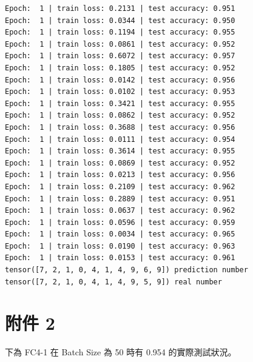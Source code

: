 \documentclass[11pt,UTF8]{ctexart}
\begin{document}
\begin{verbatim}
Epoch:  1 | train loss: 0.2131 | test accuracy: 0.951
Epoch:  1 | train loss: 0.0344 | test accuracy: 0.950
Epoch:  1 | train loss: 0.1194 | test accuracy: 0.955
Epoch:  1 | train loss: 0.0861 | test accuracy: 0.952
Epoch:  1 | train loss: 0.6072 | test accuracy: 0.957
Epoch:  1 | train loss: 0.1805 | test accuracy: 0.952
Epoch:  1 | train loss: 0.0142 | test accuracy: 0.956
Epoch:  1 | train loss: 0.0102 | test accuracy: 0.953
Epoch:  1 | train loss: 0.3421 | test accuracy: 0.955
Epoch:  1 | train loss: 0.0862 | test accuracy: 0.952
Epoch:  1 | train loss: 0.3688 | test accuracy: 0.956
Epoch:  1 | train loss: 0.0111 | test accuracy: 0.954
Epoch:  1 | train loss: 0.3614 | test accuracy: 0.955
Epoch:  1 | train loss: 0.0869 | test accuracy: 0.952
Epoch:  1 | train loss: 0.0213 | test accuracy: 0.956
Epoch:  1 | train loss: 0.2109 | test accuracy: 0.962
Epoch:  1 | train loss: 0.2889 | test accuracy: 0.951
Epoch:  1 | train loss: 0.0637 | test accuracy: 0.962
Epoch:  1 | train loss: 0.0596 | test accuracy: 0.959
Epoch:  1 | train loss: 0.0034 | test accuracy: 0.965
Epoch:  1 | train loss: 0.0190 | test accuracy: 0.963
Epoch:  1 | train loss: 0.0153 | test accuracy: 0.961
tensor([7, 2, 1, 0, 4, 1, 4, 9, 6, 9]) prediction number
tensor([7, 2, 1, 0, 4, 1, 4, 9, 5, 9]) real number
\end{verbatim}

\newpage

\section{附件 2}

下為 FC4-1 在 Batch Size 為 50 時有 0.954 的實際測試狀況。
\end{document}
